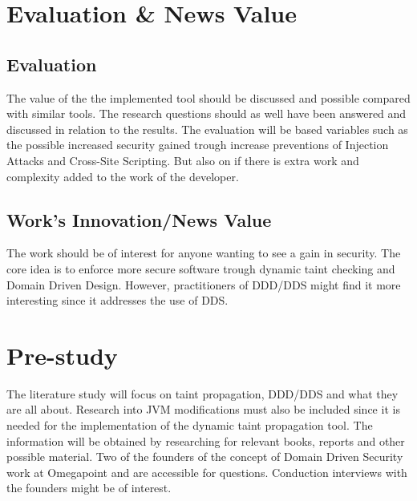 \documentclass{../kththesis}
\begin{document}
\chapter{Evaluation \& News Value}
\section{Evaluation}
The value of the the implemented tool should be discussed and possible compared with similar tools. The research questions should as well have been answered and discussed in relation to the results. The evaluation will be based variables such as the possible increased security gained trough increase preventions of Injection Attacks and Cross-Site Scripting. But also on if there is extra work and complexity added to the work of the developer.


\section{Work's Innovation/News Value}
The work should be of interest for anyone wanting to see a gain in security. The core idea is to enforce more secure software trough dynamic taint checking and Domain Driven Design. However, practitioners of DDD/DDS might find it more interesting since it addresses the use of DDS.



\chapter{Pre-study}
The literature study will focus on taint propagation, DDD/DDS and what they are all about. Research into JVM modifications must also be included since it is needed for the implementation of the dynamic taint propagation tool. The information will be obtained by researching for relevant books, reports and other possible material. Two of the founders of the concept of Domain Driven Security work at Omegapoint and are accessible for questions. Conduction interviews with the founders might be of interest.
\end{document}

